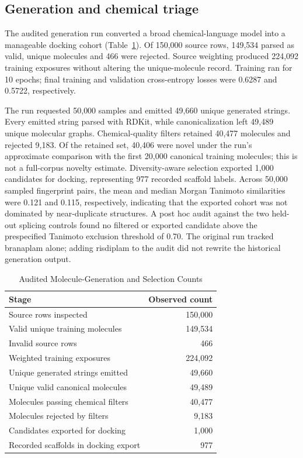 \documentclass[journal]{IEEEtran}
\begin{document}
\subsection{Generation and chemical triage}
\label{sec:res-generation}

The audited generation run converted a broad chemical-language model
into a manageable docking cohort (Table~\ref{tab:generation}). Of
150{,}000 source rows, 149{,}534 parsed as valid, unique molecules and
466 were rejected. Source weighting produced 224{,}092 training
exposures without altering the unique-molecule record. Training ran for
10 epochs; final training and validation cross-entropy losses were
0.6287 and 0.5722, respectively.

The run requested 50{,}000 samples and emitted 49{,}660 unique generated
strings. Every emitted string parsed with RDKit, while canonicalization
left 49{,}489 unique molecular graphs. Chemical-quality filters retained
40{,}477 molecules and rejected 9{,}183. Of the retained set, 40{,}406
were novel under the run's approximate comparison with the first
20{,}000 canonical training molecules; this is not a full-corpus novelty
estimate. Diversity-aware
selection exported 1{,}000 candidates for docking, representing 977
recorded scaffold labels. Across 50{,}000 sampled fingerprint pairs,
the mean and median Morgan Tanimoto similarities were 0.121 and 0.115,
respectively, indicating that the exported cohort was not dominated by
near-duplicate structures. A post hoc audit against the two held-out
splicing controls found no filtered or exported candidate above the
prespecified Tanimoto exclusion threshold of 0.70. The original run
tracked branaplam alone; adding risdiplam to the audit did not rewrite
the historical generation output.

\begin{table}[!t]
\caption{Audited Molecule-Generation and Selection Counts}
\label{tab:generation}
\centering
\footnotesize
\setlength{\tabcolsep}{4.5pt}
\renewcommand{\arraystretch}{1.15}
\begin{tabular}{@{}lr@{}}
\toprule
\textbf{Stage} & \textbf{Observed count}\\
\midrule
Source rows inspected & 150{,}000\\
Valid unique training molecules & 149{,}534\\
Invalid source rows & 466\\
Weighted training exposures & 224{,}092\\
Unique generated strings emitted & 49{,}660\\
Unique valid canonical molecules & 49{,}489\\
Molecules passing chemical filters & 40{,}477\\
Molecules rejected by filters & 9{,}183\\
Candidates exported for docking & 1{,}000\\
Recorded scaffolds in docking export & 977\\
\bottomrule
\end{tabular}
\end{table}
\end{document}

